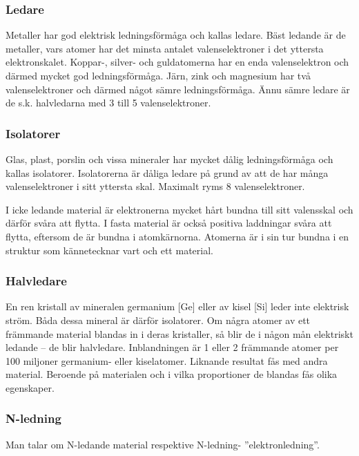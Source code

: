 \subsubsection{Ledare}

Metaller har god elektrisk ledningsförmåga och kallas ledare.
Bäst ledande är de metaller, vars atomer har det minsta antalet
valenselektroner i det yttersta elektronskalet.
Koppar-, silver- och guldatomerna har en enda valenselektron och därmed mycket
god ledningsförmåga.
Järn, zink och magnesium har två valenselektroner och därmed något sämre
ledningsförmåga.
Ännu sämre ledare är de s.k. halvledarna med 3 till 5 valenselektroner.

\subsubsection{Isolatorer}

Glas, plast, porslin och vissa mineraler har mycket dålig ledningsförmåga och
kallas isolatorer.
Isolatorerna är dåliga ledare på grund av att de har många valenselektroner i
sitt yttersta skal.
Maximalt ryms 8 valenselektroner.

I icke ledande material är elektronerna mycket hårt bundna till sitt valensskal
och därför svåra att flytta.
I fasta material är också positiva laddningar svåra att flytta, eftersom de är
bundna i atomkärnorna.
Atomerna är i sin tur bundna i en struktur som kännetecknar vart och ett
material.

\subsubsection{Halvledare}

En ren kristall av mineralen germanium [Ge] eller av kisel [Si] leder
inte elektrisk ström.
Båda dessa mineral är därför isolatorer.
Om några atomer av ett främmande material blandas in i deras kristaller, så
blir de i någon mån elektriskt ledande -- de blir halvledare.
Inblandningen är 1 eller 2 främmande atomer per 100 miljoner germanium- eller
kiselatomer.
Liknande resultat fås med andra material.
Beroende på materialen och i vilka proportioner de blandas fås olika egenskaper.

\subsubsection{N-ledning}
Man talar om N-ledande material respektive N-ledning- ''elektronledning''.

